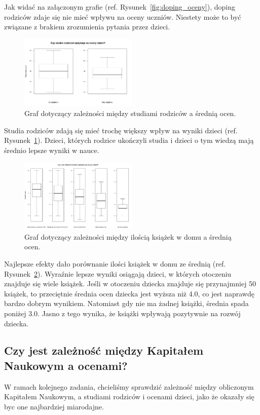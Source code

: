 \documentclass[conference]{IEEEtran}
\begin{document}
Jak widać na załączonym grafie (ref. Rysunek~\ref{fig:doping_oceny}), doping rodziców zdaje się nie mieć wpływu na oceny uczniów. Niestety może to być związane z brakiem zrozumienia pytania przez dzieci.

\begin{figure}
	\centering
	\includegraphics[width=0.5\textwidth]{4.png}
	\caption{Graf dotyczący zależności między studiami rodziców a średnią ocen.}
	\label{fig:studia_oceny}
\end{figure}

Studia rodziców zdają się mieć trochę większy wpływ na wyniki dzieci (ref. Rysunek~\ref{fig:studia_oceny}). Dzieci, których rodzice ukończyli studia i dzieci o tym wiedzą mają średnio lepsze wyniki w nauce.

\begin{figure}
	\centering
	\includegraphics[width=0.5\textwidth]{5.png}
	\caption{Graf dotyczący zależności między ilością książek w domu a średnią ocen.}
	\label{fig:ksiazki_oceny}
\end{figure}

Najlepsze efekty dało porównanie ilości książek w domu ze średnią (ref. Rysunek~\ref{fig:ksiazki_oceny}). Wyraźnie lepsze wyniki osiągają dzieci, w których otoczeniu znajduje się wiele książek. Jeśli w otoczeniu dziecka znajduje się przynajmniej 50 książek, to przeciętnie średnia ocen dziecka jest wyższa niż 4.0, co jest naprawdę bardzo dobrym wynikiem. Natomiast gdy nie ma żadnej książki, średnia spada poniżej 3.0. Jasno z tego wynika, że książki wpływają pozytywnie na rozwój dziecka.

\subsection{Czy jest zależność między Kapitałem Naukowym a ocenami?}
W ramach kolejnego zadania, chcieliśmy sprawdzić zależność między obliczonym Kapitałem Naukowym, a studiami rodziców i ocenami dzieci, jako że okazały się byc one najbardziej miarodajne.
\end{document}
